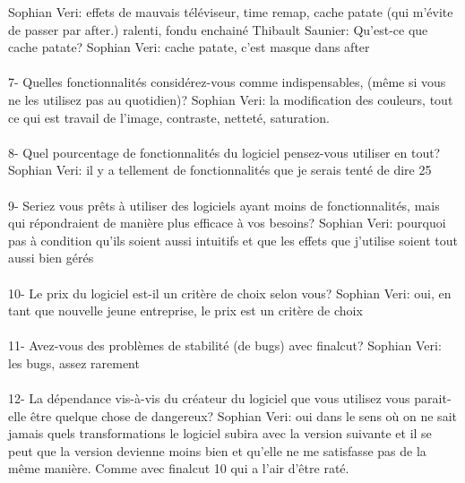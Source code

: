 Sophian Veri: effets de mauvais téléviseur, time remap, cache patate (qui m'évite
de passer par after.) ralenti, fondu enchainé
Thibault Saunier: Qu'est-ce que cache patate?
Sophian Veri: cache patate, c'est masque dans after

\paragraph{}
7-  Quelles fonctionnalités considérez-vous comme indispensables, (même si vous
ne les utilisez pas au quotidien)?
Sophian Veri: la modification des couleurs,  tout ce qui est travail de
l'image, contraste, netteté, saturation.

\paragraph{}
8- Quel pourcentage de fonctionnalités du logiciel pensez-vous utiliser
en tout?
Sophian Veri: il y a  tellement de fonctionnalités que je serais tenté
de dire 25%

\paragraph{}
9- Seriez vous prêts à utiliser des logiciels ayant moins de fonctionnalités,
mais qui répondraient de manière plus efficace à vos besoins?
Sophian Veri: pourquoi pas à condition qu'ils soient aussi intuitifs et que les effets
que j'utilise soient tout aussi bien gérés

\paragraph{}
10-  Le prix du logiciel est-il un critère de choix selon vous?
Sophian Veri: oui, en tant que nouvelle jeune entreprise, le prix est
un critère de choix

\paragraph{}
11- Avez-vous des problèmes de stabilité (de bugs) avec finalcut?
Sophian Veri: les bugs, assez rarement

\paragraph{}
12- La dépendance vis-à-vis du créateur du logiciel que vous utilisez
vous parait-elle être quelque chose de dangereux?
Sophian Veri: oui dans le sens où on ne sait jamais quels transformations le
logiciel subira avec la version suivante et il se peut que la version devienne
moins bien et qu'elle ne me satisfasse pas de la même manière. Comme avec
finalcut 10 qui a l'air d'être raté.

